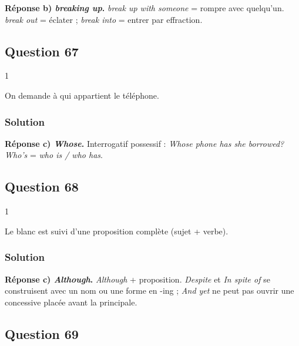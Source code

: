 \documentclass[11pt,a4paper]{article}
\begin{document}
\textbf{Réponse b) \emph{breaking up}.} \emph{break up with someone} = rompre avec quelqu'un. \emph{break out} = éclater ; \emph{break into} = entrer par effraction.

\hypertarget{question-67}{%
\subsection{Question 67}\label{question-67}}

\begin{indication}{1}

On demande à qui appartient le téléphone.

\end{indication}

\hypertarget{solution-66}{%
\subsubsection{Solution}\label{solution-66}}

\textbf{Réponse c) \emph{Whose}.} Interrogatif possessif : \emph{Whose phone has she borrowed?} \emph{Who's} = \emph{who is / who has}.

\hypertarget{question-68}{%
\subsection{Question 68}\label{question-68}}

\begin{indication}{1}

Le blanc est suivi d'une proposition complète (sujet + verbe).

\end{indication}

\hypertarget{solution-67}{%
\subsubsection{Solution}\label{solution-67}}

\textbf{Réponse c) \emph{Although}.} \emph{Although} + proposition. \emph{Despite} et \emph{In spite of} se construisent avec un nom ou une forme en -ing ; \emph{And yet} ne peut pas ouvrir une concessive placée avant la principale.

\hypertarget{question-69}{%
\subsection{Question 69}\label{question-69}}
\end{document}
